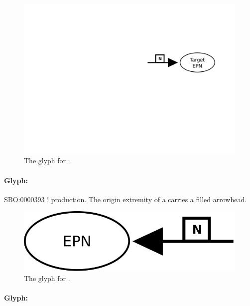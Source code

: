 \begin{figure}[htb]
  \centering
  \includegraphics[scale = 0.4]{images/production}
  \caption{The \PD glyph for .}
  \label{fig:techref:production}
\end{figure}

\paragraph{Glyph: }\label{sec:techref:reversible}

\begin{glyphDescription}
 \glyphSboTerm SBO:0000393 ! production.
 \glyphEndPoint The origin extremity of a  carries a filled arrowhead.
 \end{glyphDescription}

\begin{figure}[htb]
  \centering
  \includegraphics[scale = 0.4]{images/reversible}
  \caption{The \PD glyph for .}
  \label{fig:techref:reversible}
\end{figure}


\paragraph{Glyph: }
\label{defn:stoichlabel}

